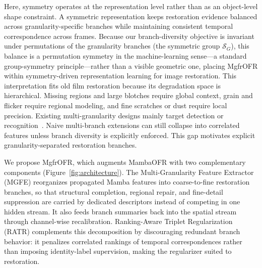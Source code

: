 Here, symmetry operates at the representation level rather than as an object-level shape constraint. A symmetric representation keeps restoration evidence balanced across granularity-specific branches while maintaining consistent temporal correspondence across frames. Because our branch-diversity objective is invariant under permutations of the granularity branches (the symmetric group $\mathcal{S}_G$), this balance is a permutation symmetry in the machine-learning sense---a standard group-symmetry principle---rather than a visible geometric one, placing MgfrOFR within symmetry-driven representation learning for image restoration. This interpretation fits old film restoration because its degradation space is hierarchical. Missing regions and large blotches require global context, grain and flicker require regional modeling, and fine scratches or dust require local precision. Existing multi-granularity designs mainly target detection or recognition~\cite{lin2017fpn,wang2021hrnet,sun2018pcb,wang2018mgn,gu2025reidmamba}. Naive multi-branch extensions can still collapse into correlated features unless branch diversity is explicitly enforced. This gap motivates explicit granularity-separated restoration branches.

We propose MgfrOFR, which augments MambaOFR with two complementary components (Figure~\ref{fig:architecture}). The Multi-Granularity Feature Extractor (MGFE) reorganizes propagated Mamba features into coarse-to-fine restoration branches, so that structural completion, regional repair, and fine-detail suppression are carried by dedicated descriptors instead of competing in one hidden stream. It also feeds branch summaries back into the spatial stream through channel-wise recalibration. Ranking-Aware Triplet Regularization (RATR) complements this decomposition by discouraging redundant branch behavior: it penalizes correlated rankings of temporal correspondences rather than imposing identity-label supervision, making the regularizer suited to restoration.

